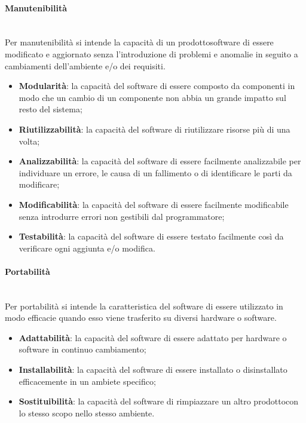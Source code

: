 	\paragraph{Manutenibilità} \mbox{}\\
	Per manutenibilità si intende la capacità di un prodotto\glosp software di essere modificato e aggiornato senza l'introduzione di problemi e anomalie in seguito a cambiamenti dell'ambiente e/o dei requisiti.
	\begin{itemize}
		\item \textbf{Modularità}: la capacità del software di essere composto da componenti in modo che un cambio di un componente non abbia un grande impatto sul resto del sistema;
		\item \textbf{Riutilizzabilità}: la capacità del software di riutilizzare risorse più di una volta;
		\item \textbf{Analizzabilità}: la capacità del software di essere facilmente analizzabile per individuare un errore, le causa di un fallimento o di identificare le parti da modificare;
		\item \textbf{Modificabilità}: la capacità del software di essere facilmente modificabile senza introdurre errori non gestibili dal programmatore;
		\item \textbf{Testabilità}: la capacità del software di essere testato facilmente così da verificare ogni aggiunta e/o modifica.
	\end{itemize}
	\paragraph{Portabilità} \mbox{}\\ 
	Per portabilità si intende la caratteristica del software di essere utilizzato in modo efficacie quando esso viene trasferito su diversi hardware o software.
	\begin{itemize}
		\item \textbf{Adattabilità}: la capacità del software di essere adattato per hardware o software in continuo cambiamento;
		\item \textbf{Installabilità}: la capacità del software di essere installato o disinstallato efficacemente in un ambiete specifico;
		\item \textbf{Sostituibilità}: la capacità del software di rimpiazzare un altro prodotto\glosp con lo stesso scopo nello stesso ambiente.
	\end{itemize}
